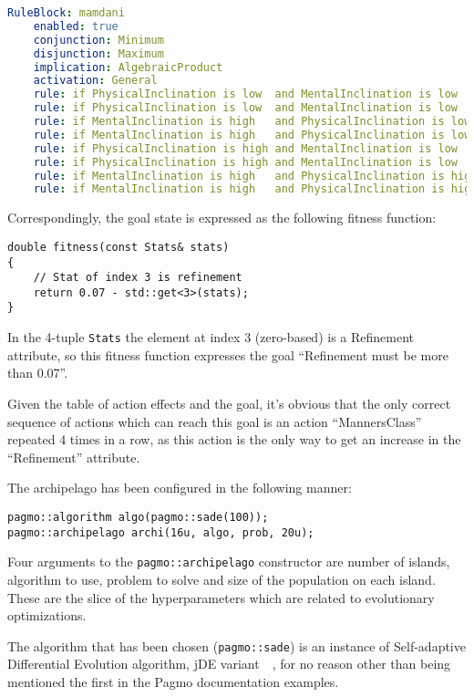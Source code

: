 \documentclass[12pt, a4paper]{article}
\begin{document}
\begin{lstlisting}[language=yaml]
RuleBlock: mamdani
	enabled: true
	conjunction: Minimum
	disjunction: Maximum
	implication: AlgebraicProduct
	activation: General
	rule: if PhysicalInclination is low  and MentalInclination is low    then MannersClass is high
	rule: if PhysicalInclination is low  and MentalInclination is low    then Hunting is low
	rule: if MentalInclination is high   and PhysicalInclination is low  then ScienceClass is high
	rule: if MentalInclination is high   and PhysicalInclination is low  then Lumberjack is low
	rule: if PhysicalInclination is high and MentalInclination is low    then Lumberjack is high
	rule: if PhysicalInclination is high and MentalInclination is low    then ScienceClass is low
	rule: if MentalInclination is high   and PhysicalInclination is high then Hunting is high
	rule: if MentalInclination is high   and PhysicalInclination is high then MannersClass is low
	\end{lstlisting}
	
	Correspondingly, the goal state is expressed as the following fitness function:
	
	\begin{lstlisting}
double fitness(const Stats& stats)
{
	// Stat of index 3 is refinement
	return 0.07 - std::get<3>(stats);
}
	\end{lstlisting}
	
	In the 4-tuple \texttt{Stats} the element at index 3 (zero-based) is a Refinement attribute, so this fitness function expresses the goal ``Refinement must be more than 0.07''.
	
	Given the table of action effects and the goal, it's obvious that the only correct sequence of actions which can reach this goal is an action ``MannersClass'' repeated 4 times in a row, as this action is the only way to get an increase in the ``Refinement'' attribute.
	
	The archipelago has been configured in the following manner:
	
	\begin{lstlisting}
pagmo::algorithm algo(pagmo::sade(100));
pagmo::archipelago archi(16u, algo, prob, 20u);
	\end{lstlisting}

	Four arguments to the \texttt{pagmo::archipelago} constructor are number of islands, algorithm to use, problem to solve and size of the population on each island.
	These are the slice of the hyperparameters which are related to evolutionary optimizations.
	
	The algorithm that has been chosen (\texttt{pagmo::sade}) is an instance of Self-adaptive Differential Evolution algorithm, jDE variant~\cite{sade_jDE}~\cite{sade_iDE}, for no reason other than being mentioned the first in the Pagmo documentation examples.
\end{document}
